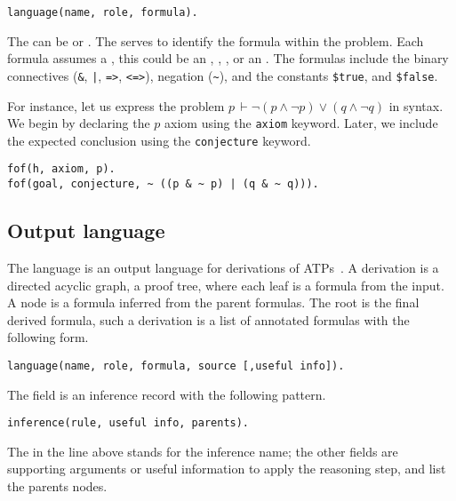 \documentclass[../main.tex]{subfiles}
\begin{document}
\begin{verbatim}
language(name, role, formula).
\end{verbatim}

The  can be  or . The 
serves to identify the formula within the problem. Each formula
assumes a , this could be an ,
, ,  or an .
The formulas include the binary connectives
(\verb!&!, \verb!|!, \verb!=>!, \verb!<=>!), negation (\verb!~!),
and the constants \verb!$true!, and \verb!$false!.

For instance, let us express the problem
$p\, \vdash \neg (p \wedge \neg p) ∨ (q \wedge \neg q)$
in \TPTP syntax. We begin by declaring the $p$ axiom using the \verb!axiom!
keyword. Later, we include the expected conclusion using the
\verb!conjecture! keyword.

\begin{verbatim}
fof(h, axiom, p).
fof(goal, conjecture, ~ ((p & ~ p) | (q & ~ q))).
\end{verbatim}

\subsection{Output language}
\label{ssec:output-language}

The \TSTP language is an output language for derivations of
ATPs~\cite{Sutcliffe-Schulz-Claessen-VanGelder-2006,Sicard-Ramirez2016}.
A \TSTP derivation is a directed acyclic graph, a proof tree,
where each leaf is a formula from the \TPTP input. A node is a formula
inferred from the parent formulas. The root is the final derived formula,
such a derivation is a list of annotated formulas with the following form.

\begin{verbatim}
language(name, role, formula, source [,useful info]).
\end{verbatim}

The  field is an inference record with the following
pattern.

\begin{verbatim}
inference(rule, useful info, parents).
\end{verbatim}

The  in the line above stands for the inference name;
the other fields are supporting arguments or useful information to
apply the reasoning step, and list the parents nodes.
\end{document}
